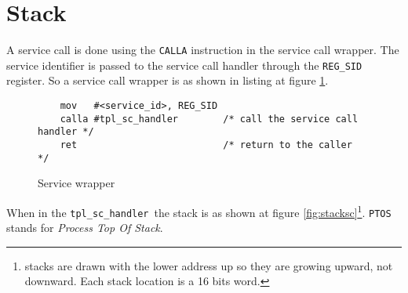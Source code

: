 \documentclass[11pt, oneside]{article}   	%
\newcommand{\sch}{\lstinline{tpl_sc_handler}}
\begin{document}

\section{Stack}

A service call is done using the \lstinline{CALLA} instruction in the service call wrapper. The service identifier is passed to the service call handler through the \lstinline{REG_SID} register. So a service call wrapper is as shown in listing at figure \ref{lst:wrapper}.

\begin{figure}[h]
\caption{Service wrapper}
\begin{lstlisting}
    mov   #<service_id>, REG_SID
    calla #tpl_sc_handler        /* call the service call handler */
    ret                          /* return to the caller          */
\end{lstlisting}
\label{lst:wrapper}
\end{figure}

When in the \sch\ the stack is as shown at figure \ref{fig:stacksc}\footnote{stacks are drawn with the lower address up so they are growing upward, not downward. Each stack location is a 16 bits word.}. \texttt{PTOS} stands for \emph{Process Top Of Stack}.
\end{document}
